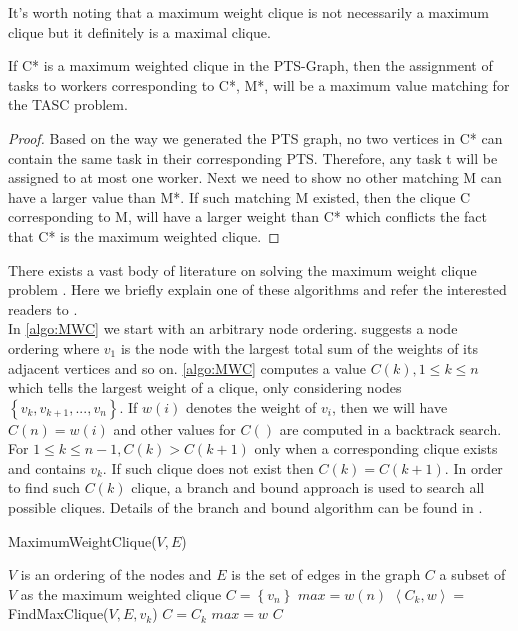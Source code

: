 It's worth noting that a maximum weight clique is not necessarily a maximum clique but it definitely is a maximal clique.

\begin{theorem}
\label{th:maxClique}
If C* is a maximum weighted clique in the PTS-Graph, then the assignment of tasks to workers corresponding to C*, M*, will be a maximum value matching for the TASC problem.
\end{theorem}

\begin{proof}
Based on the way we generated the PTS graph, no two vertices in C* can contain the same task in their corresponding PTS. Therefore, any task t will be assigned to at most one worker. Next we need to show no other matching M can have a larger value than M*. If such matching M existed, then the clique C corresponding to M, will have a larger weight than C* which conflicts the fact that C* is the maximum weighted clique.
\end{proof}

There exists a vast body of literature on solving the maximum weight clique problem \cite{Kovalyov07}. Here we briefly explain one of these algorithms and refer the interested readers to \cite{Ostergard01}.\\

In \cref{algo:MWC} we start with an arbitrary node ordering. \cite{Ostergard01} suggests a node ordering where $v_1$ is the node with the largest total sum of the weights of its adjacent vertices and so on. \cref{algo:MWC} computes a value $C(k), 1 \leq k \leq n$ which tells the largest weight of a clique, only considering nodes $\left\{v_k, v_{k+1}, ..., v_n\right\}$. If $w(i)$ denotes the weight of $v_i$, then we will have $C(n) = w(i)$ and other values for $C()$ are computed in a backtrack search. For $1 \leq k \leq n-1, C(k) > C(k+1)$ only when a corresponding clique exists and contains $v_k$. If such clique does not exist then $C(k) = C(k+1)$. In order to find such $C(k)$ clique, a branch and bound approach is used to search all possible cliques. Details of the branch and bound algorithm can be found in \cite{Ostergard01}.

\begin{algorithm}
\caption{MaximumWeightClique($V, E$)}
\label{algo:MWC}
\begin{algorithmic}[1]
\REQUIRE $V$ is an ordering of the nodes and $E$ is the set of edges in the graph
\ENSURE $C$ a subset of $V$ as the maximum weighted clique
\STATE $C = \left\{ v_n \right\}$
\STATE $max = w(n)$
	\STATE $\left\langle C_k, w \right\rangle =$ FindMaxClique($V, E, v_k$)
		\STATE $C = C_k$
		\STATE $max = w$
	\ENDIF
\ENDFOR
\RETURN $C$
\end{algorithmic}
\end{algorithm}

